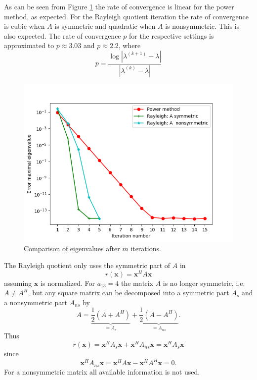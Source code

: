 As can be seen from Figure \ref{fig:task2} the rate of convergence is linear for the power method, as expected. For the Rayleigh quotient iteration the rate of convergence is cubic when $A$ is symmetric and quadratic when $A$ is nonsymmetric. This is also expected. The rate of convergence $p$ for the respective settings is approximated to $p\approx 3.03$ and $p \approx 2.2$, where
\begin{equation}
  p = \frac{\log{|\lambda^{(k+1)}-\lambda|}}{|\lambda^{(k)}-\lambda|}
\end{equation}
\begin{figure}[h!]
\centering
\includegraphics[scale=0.8]{../task2/task2.png}
\caption{Comparison of eigenvalues after $m$ iterations.}
\label{fig:task2}
\end{figure}

The Rayleigh quotient only uses the symmetric part of $A$ in
\begin{equation*}
  r(\mathbf{x}) = \mathbf{x}^{H}A\mathbf{x}
\end{equation*}
assuming $\mathbf{x}$ is normalized.
For $a_{13} = 4$ the matrix $A$ is no longer symmetric, i.e. $A\neq A^{H}$, but any square matrix can be decomposed into a symmetric part $A_{s}$ and a nonsymmetric part $A_{ns}$ by
\begin{equation}
  A = \underbrace{\frac{1}{2}\left(A + A^{H}\right)}_{= A_{s}} + \underbrace{\frac{1}{2}\left(A - A^{H}\right)}_{=A_{ns}}.
\end{equation}
Thus
\begin{equation*}
  r(\mathbf{x}) = \mathbf{x}^{H}A_{s}\mathbf{x} + \mathbf{x}^{H}A_{ns}\mathbf{x} = \mathbf{x}^{H}A_{s}\mathbf{x}
\end{equation*}
since
\begin{equation*}
 \mathbf{x}^{H}A_{ns}\mathbf{x}=\mathbf{x}^{H}A\mathbf{x} - \mathbf{x}^{H}A^{H}\mathbf{x} = 0.
\end{equation*}
For a nonsymmetric matrix all available information is not used.
